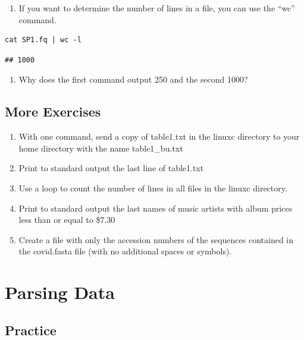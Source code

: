 \documentclass[
]{book}
\providecommand{\tightlist}{%
  \setlength{\itemsep}{0pt}\setlength{\parskip}{0pt}}
\begin{document}
\begin{enumerate}
\def\labelenumi{\arabic{enumi})}
\setcounter{enumi}{6}
\tightlist
\item
  If you want to determine the number of lines in a file, you can use the ``wc'' command.
\end{enumerate}

\begin{verbatim}
cat SP1.fq | wc -l
\end{verbatim}

\begin{verbatim}
## 1000
\end{verbatim}

\begin{enumerate}
\def\labelenumi{\arabic{enumi})}
\setcounter{enumi}{7}
\tightlist
\item
  Why does the first command output 250 and the second 1000?
\end{enumerate}

\hypertarget{more-exercises}{%
\section{More Exercises}\label{more-exercises}}

\begin{enumerate}
\def\labelenumi{\arabic{enumi}.}
\item
  With one command, send a copy of table1.txt in the linuxc directory to your home directory with the name table1\_bu.txt
\item
  Print to standard output the last line of table1.txt
\item
  Use a loop to count the number of lines in all files in the linuxc directory.
\item
  Print to standard output the last names of music artists with album prices less than or equal to \$7.30
\item
  Create a file with only the accession numbers of the sequences contained in the covid.fasta file (with no additional spaces or symbols).
\end{enumerate}

\hypertarget{parsing-data}{%
\chapter{Parsing Data}\label{parsing-data}}

\hypertarget{practice}{%
\section{Practice}\label{practice}}
\end{document}
